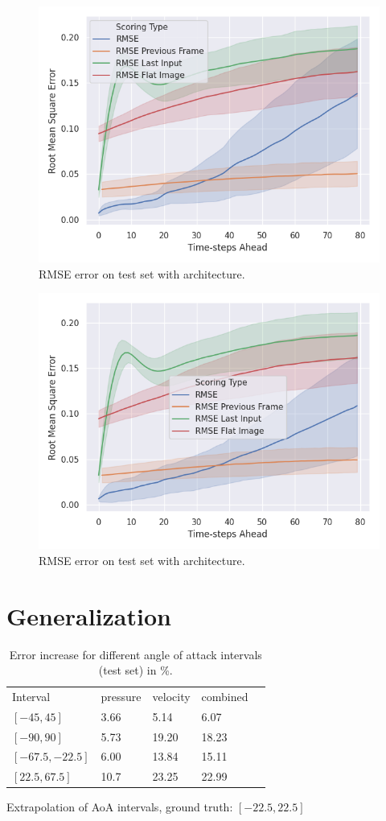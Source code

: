 \documentclass[acmtog]{techreportacmart}
\begin{document}
\begin{figure}[h]
  \includegraphics[width=.35\textwidth]{figures/transfer/DFP_Test_RMSE_Quality_start_15}
  \caption{RMSE error on test set with \cite{Thuerey20} architecture.}
  \label{fig:T1}
\end{figure}

\begin{figure}[h]
  \includegraphics[width=.35\textwidth]{figures/transfer/Transfer_Test_RMSE_Quality_start_15}
  \caption{RMSE error on test set with \cite{Fotiadis2020} architecture.}
  \label{fig:T2}
\end{figure}

\section{Generalization}

\begin{table}
	\caption{Error increase for different angle of attack intervals (test set) in \%.}
\label{tab:gen1}
\begin{center}
\begin{tabular}{l|l|l|l|l}
  \toprule
  Interval   		& pressure   &	velocity    & combined \\
  $[-45, 45]$	 	& 3.66	  & 5.14		& 6.07	   \\
  $[-90, 90]$	 	& 5.73	  & 19.20		& 18.23	   \\
  $[-67.5, -22.5]$ 	& 6.00	  & 13.84		& 15.11	   \\
  $[22.5, 67.5]$  	& 10.7	  & 23.25		& 22.99	   \\
  \bottomrule
\end{tabular}
\end{center}
\bigskip\centering
	\footnotesize Extrapolation of AoA intervals, ground truth: $[-22.5, 22.5]$ \\
\end{table}%
\end{document}
